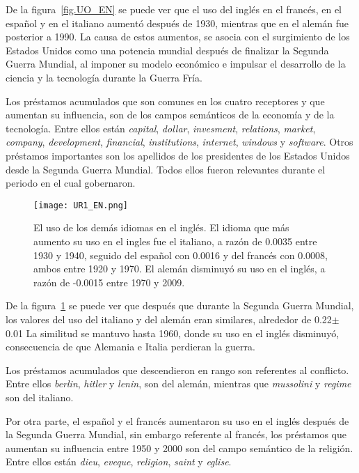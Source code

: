 De la figura~\ref{fig.UO_EN} se puede ver que el uso del inglés en el francés, en el español y en el italiano aumentó después de 1930, mientras que en el alemán fue posterior a 1990.  La causa de estos aumentos, se asocia con el surgimiento de los Estados Unidos como una potencia mundial después de finalizar la Segunda Guerra Mundial,  al  imponer  su modelo económico e impulsar el desarrollo de la ciencia y la tecnología durante la Guerra Fría.

Los préstamos acumulados que son comunes en los cuatro receptores y que aumentan su influencia, son de los campos semánticos de la economía y de la tecnología. Entre ellos están \textit{capital}, \textit{dollar}, \textit{invesment}, \textit{relations}, \textit{market}, \textit{company}, \textit{development}, \textit{financial},  \textit{institutions}, \textit{internet}, \textit{windows} y \textit{software}. Otros préstamos importantes son los apellidos de los presidentes de los Estados Unidos desde la Segunda Guerra Mundial. Todos ellos fueron relevantes durante el periodo en el cual gobernaron. 
\label{EN-D}

\begin{figure}[h!]
	\centering
	\texttt{[image: UR1\_EN.png]}
	\caption{El uso de los demás idiomas en el inglés. El idioma que más aumento su uso en el ingles fue el italiano, a razón de 0.0035 entre 1930 y 1940, seguido del español con 0.0016 y del francés con 0.0008, ambos entre 1920 y 1970. El alemán disminuyó su uso en el inglés, a razón de -0.0015 entre 1970 y 2009.}
	\label{fig.UR_EN}
\end{figure} 


De la figura~\ref{fig.UR_EN} se puede ver que después que durante la Segunda Guerra Mundial, los valores del uso del italiano y del alemán eran similares, alrededor de 0.22$\pm$0.01 La similitud se mantuvo hasta 1960, donde su uso en el inglés disminuyó, consecuencia de que Alemania e Italia perdieran la guerra.

Los préstamos acumulados que descendieron en rango son referentes al conflicto. Entre ellos \textit{berlin}, \textit{hitler} y \textit{lenin}, son del alemán,  mientras que \textit{mussolini} y \textit{regime} son del italiano. 

Por otra parte, el español y el francés aumentaron su uso en el inglés después de la Segunda Guerra Mundial, sin embargo  referente al francés, los préstamos que aumentan su influencia entre 1950 y 2000 son del campo semántico de la religión. Entre ellos están \textit{dieu}, \textit{eveque}, \textit{religion}, \textit{saint} y \textit{eglise}.

